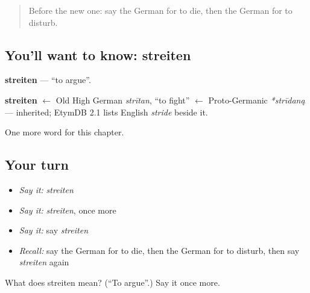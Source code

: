 \begin{quote}
Before the new one: say the German for to die, then the German for to disturb.
\end{quote}

\subsection*{You'll want to know: streiten}
\textbf{streiten} — \textquotedblleft{}to argue\textquotedblright{}.

\begin{cousinweb}
\textbf{streiten} $\leftarrow$ Old High German \emph{strītan}, \textquotedblleft{}to fight\textquotedblright{} $\leftarrow$ Proto-Germanic \emph{*strīdaną} — inherited; EtymDB 2.1 lists English \emph{stride} beside it.
\end{cousinweb}

\begin{grammarlens}[title={What you've built}]
One more word for this chapter.
\end{grammarlens}

\subsection*{Your turn}
\begin{itemize}
\raggedright
  \item \emph{Say it:} \emph{streiten}
  \item \emph{Say it:} \emph{streiten}, once more
  \item \emph{Say it:} say \emph{streiten}
  \item \emph{Recall:} say the German for to die, then the German for to disturb, then say \emph{streiten} again
\end{itemize}

\begin{tcolorbox}[breakable,colback=teal!4,colframe=teal!35!black,title={Before you move on}]
What does streiten mean? (\textquotedblleft{}To argue\textquotedblright{}.) Say it once more.
\end{tcolorbox}
